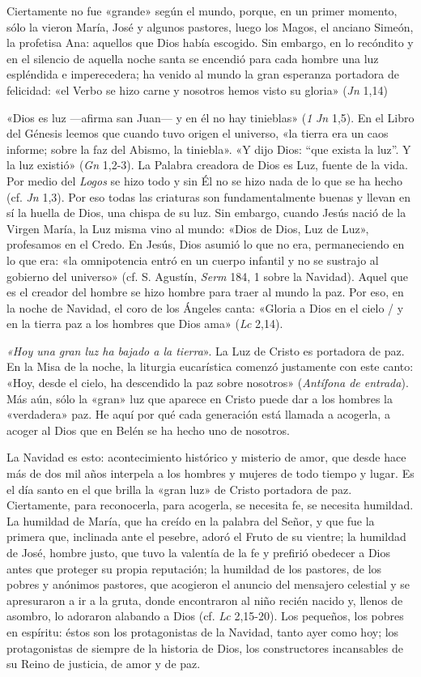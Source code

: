 Ciertamente no fue «grande» según el mundo, porque, en un primer
momento, sólo la vieron María, José y algunos pastores, luego los Magos,
el anciano Simeón, la profetisa Ana: aquellos que Dios había escogido.
Sin embargo, en lo recóndito y en el silencio de aquella noche santa se
encendió para cada hombre una luz espléndida e imperecedera; ha venido
al mundo la gran esperanza portadora de felicidad: «el Verbo se hizo
carne y nosotros hemos visto su gloria» (\emph{Jn} 1,14)

«Dios es luz ---afirma san Juan--- y en él no hay tinieblas» (\emph{1}
\emph{Jn} 1,5). En el Libro del Génesis leemos que cuando tuvo origen el
universo, «la tierra era un caos informe; sobre la faz del Abismo, la
tiniebla». «Y dijo Dios: ``que exista la luz''. Y la luz existió»
(\emph{Gn} 1,2-3). La Palabra creadora de Dios es Luz, fuente de la
vida. Por medio del \emph{Logos} se hizo todo y sin Él no se hizo nada
de lo que se ha hecho (cf. \emph{Jn} 1,3). Por eso todas las criaturas
son fundamentalmente buenas y llevan en sí la huella de Dios, una chispa
de su luz. Sin embargo, cuando Jesús nació de la Virgen María, la Luz
misma vino al mundo: «Dios de Dios, Luz de Luz», profesamos en el Credo.
En Jesús, Dios asumió lo que no era, permaneciendo en lo que era: «la
omnipotencia entró en un cuerpo infantil y no se sustrajo al gobierno
del universo» (cf. S. Agustín, \emph{Serm} 184, 1 sobre la Navidad).
Aquel que es el creador del hombre se hizo hombre para traer al mundo la
paz. Por eso, en la noche de Navidad, el coro de los Ángeles canta:
«Gloria a Dios en el cielo / y en la tierra paz a los hombres que Dios
ama» (\emph{Lc} 2,14).

\emph{«Hoy una gran luz ha bajado a la tierra}». La Luz de Cristo es
portadora de paz. En la Misa de la noche, la liturgia eucarística
comenzó justamente con este canto: «Hoy, desde el cielo, ha descendido
la paz sobre nosotros» (\emph{Antífona de entrada}). Más aún, sólo la
«gran» luz que aparece en Cristo puede dar a los hombres la «verdadera»
paz. He aquí por qué cada generación está llamada a acogerla, a acoger
al Dios que en Belén se ha hecho uno de nosotros.

La Navidad es esto: acontecimiento histórico y misterio de amor, que
desde hace más de dos mil años interpela a los hombres y mujeres de todo
tiempo y lugar. Es el día santo en el que brilla la «gran luz» de Cristo
portadora de paz. Ciertamente, para reconocerla, para acogerla, se
necesita fe, se necesita humildad. La humildad de María, que ha creído
en la palabra del Señor, y que fue la primera que, inclinada ante el
pesebre, adoró el Fruto de su vientre; la humildad de José, hombre
justo, que tuvo la valentía de la fe y prefirió obedecer a Dios antes
que proteger su propia reputación; la humildad de los pastores, de los
pobres y anónimos pastores, que acogieron el anuncio del mensajero
celestial y se apresuraron a ir a la gruta, donde encontraron al niño
recién nacido y, llenos de asombro, lo adoraron alabando a Dios (cf.
\emph{Lc} 2,15-20). Los pequeños, los pobres en espíritu: éstos son los
protagonistas de la Navidad, tanto ayer como hoy; los protagonistas de
siempre de la historia de Dios, los constructores incansables de su
Reino de justicia, de amor y de paz.

